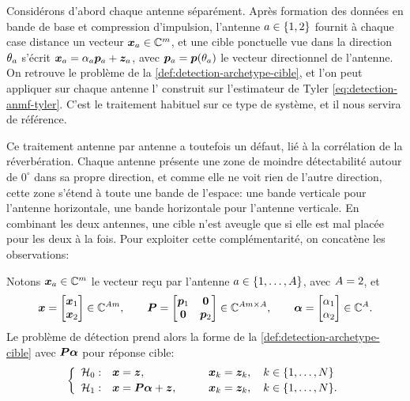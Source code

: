 Considérons d'abord chaque antenne séparément. Après formation des données en bande de base et compression d'impulsion, l'antenne $a\in\{1,2\}$ fournit à chaque case distance un vecteur $\boldsymbol{x}_a\in\mathbb{C}^{m}$, et une cible ponctuelle vue dans la direction $\theta_a$ s'écrit $\boldsymbol{x}_a=\alpha_a\boldsymbol{p}_a+\boldsymbol{z}_a$, avec $\boldsymbol{p}_a=\boldsymbol{p}(\theta_a)$ le vecteur directionnel de l'antenne. On retrouve le problème de la \cref{def:detection-archetype-cible}, et l'on peut appliquer sur chaque antenne l' construit sur l'estimateur de Tyler \cref{eq:detection-anmf-tyler}. C'est le traitement habituel sur ce type de système, et il nous servira de référence.

Ce traitement antenne par antenne a toutefois un défaut, lié à la corrélation de la réverbération. Chaque antenne présente une zone de moindre détectabilité autour de $0^\circ$ dans sa propre direction, et comme elle ne voit rien de l'autre direction, cette zone s'étend à toute une bande de l'espace: une bande verticale pour l'antenne horizontale, une bande horizontale pour l'antenne verticale. En combinant les deux antennes, une cible n'est aveugle que si elle est mal placée pour les deux à la fois. Pour exploiter cette complémentarité, on concatène les observations:

\begin{definition}
\label{def:detection-mills-modele}
  Notons $\boldsymbol{x}_a\in\mathbb{C}^{m}$ le vecteur reçu par l'antenne $a\in\{1,\dots,A\}$, avec $A=2$, et
  \begin{equation}
    \boldsymbol{x} = \begin{bmatrix}\boldsymbol{x}_1\\\boldsymbol{x}_2\end{bmatrix}\in\mathbb{C}^{Am},
    \qquad
    \boldsymbol{P} = \begin{bmatrix}\boldsymbol{p}_1 & \boldsymbol{0}\\\boldsymbol{0} & \boldsymbol{p}_2\end{bmatrix}\in\mathbb{C}^{Am\times A},
    \qquad
    \boldsymbol{\alpha} = \begin{bmatrix}\alpha_1\\\alpha_2\end{bmatrix}\in\mathbb{C}^{A}.
    \label{eq:detection-mills-concat}
  \end{equation}
  Le problème de détection prend alors la forme de la \cref{def:detection-archetype-cible} avec $\boldsymbol{P}\boldsymbol{\alpha}$ pour réponse cible:
  \begin{equation}
    \left\{
    \begin{array}{lll}
      \mathcal{H}_0: & \boldsymbol{x} = \boldsymbol{z}, & \boldsymbol{x}_k = \boldsymbol{z}_k, \quad k\in\{1,\dots,N\} \\[2pt]
      \mathcal{H}_1: & \boldsymbol{x} = \boldsymbol{P}\boldsymbol{\alpha} + \boldsymbol{z}, \qquad & \boldsymbol{x}_k = \boldsymbol{z}_k, \quad k\in\{1,\dots,N\}.
    \end{array}
    \right.
    \label{eq:detection-mills-test}
  \end{equation}
\end{definition}


